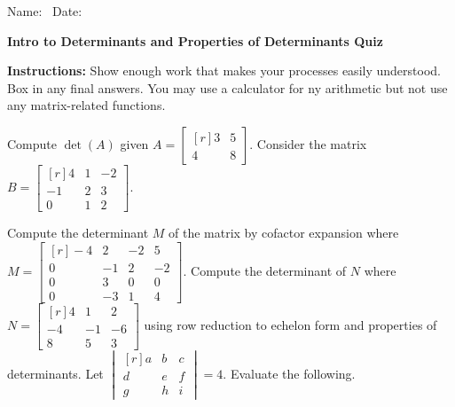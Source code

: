 \documentclass[11pt,answers]{exam} %
\newcommand{\mat}[1]{\begin{bmatrix*}[r] #1 \end{bmatrix*}}
\newcommand{\dett}[1]{\begin{vmatrix*}[r] #1 \end{vmatrix*}}
\begin{document}
\flushleft
Name:\ \makebox[4in]{\hrulefill} \hspace{1in} Date:\ \makebox[1in]{\hrulefill}
\begin{center}
    \textbf{Intro to Determinants and Properties of Determinants Quiz}
\end{center}

\textbf{Instructions:} Show enough work that makes your processes easily understood. Box in any final answers. You may use a calculator for ny arithmetic but not use any matrix-related functions.
\begin{questions}
    \question Compute $\det{(A)}$ given $A = \mat{3 & 5 \\ 4 & 8}$.
    \vspace{2 cm}
    \question Consider the matrix $B = \mat{4 & 1 & -2 \\ -1 & 2 & 3 \\ 0 & 1 & 2}$. 
    
    \question Compute the determinant $M$ of the matrix by cofactor expansion where $M = \mat{-4 & 2 & -2 & 5 \\ 0 & -1 & 2 & -2 \\ 0 & 3 & 0 & 0 \\ 0 & -3 & 1 & 4}$.
    \newpage
    \question Compute the determinant of  $N$ where $N = \mat{4 & 1 & 2 \\ -4 & -1 & -6 \\ 8 & 5 & 3}$ using row reduction to echelon form and properties of determinants.
    \vspace{14cm}
    \question Let $\dett{a & b & c \\ d & e & f \\ g & h & i} = 4$. Evaluate the following. 
\end{questions}
\end{document}
